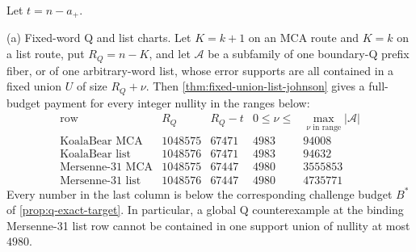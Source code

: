\documentclass[11pt,a4paper]{amsart}
\numberwithin{equation}{section}
\theoremstyle{remark}
\begin{document}
\begin{proposition}
\label{prop:active-fixed-union-payments}
Let \(t=n-a_+\).

\textup{(a) Fixed-word Q and list charts.}
Let \(K=k+1\) on an MCA route and \(K=k\) on a list route, put
\(R_Q=n-K\), and let \(\mathcal A\) be a subfamily of one boundary-Q
prefix fiber, or of one arbitrary-word list, whose error supports are all
contained in a fixed union \(U\) of size \(R_Q+\nu\).  Then
\cref{thm:fixed-union-list-johnson} gives a full-budget payment for every
integer nullity in the ranges below:
\[
\begin{array}{c|r|r|r|r}
\text{row} & R_Q & R_Q-t & 0\le\nu\le &
 \max\limits_{\nu\text{ in range}}|\mathcal A|\\ \hline
\text{KoalaBear MCA}  &1048575&67471&4983&94008\\
\text{KoalaBear list} &1048576&67471&4983&94632\\
\text{Mersenne-31 MCA}&1048575&67447&4980&3555853\\
\text{Mersenne-31 list}&1048576&67447&4980&4735771
\end{array}
\tag{FU-Q/list}\label{eq:active-fixed-union-list}
\]
Every number in the last column is below the corresponding challenge
budget \(B^*\) of \cref{prop:q-exact-target}.  In particular, a global Q
counterexample at the binding Mersenne-31 list row cannot be contained in
one support union of nullity at most \(4980\).


\end{proposition}
\end{document}
